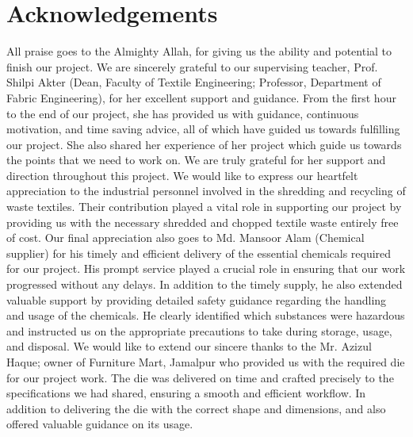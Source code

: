 \section*{Acknowledgements}
All praise goes to the Almighty Allah, for giving us the ability and potential to finish
our project. We are sincerely grateful to our supervising teacher, Prof. Shilpi Akter (Dean, Faculty of Textile Engineering; Professor, Department of Fabric Engineering), for her excellent support and guidance. From the first hour to the end of our project, she has provided us with guidance, continuous motivation, and time saving advice, all of which have guided us towards fulfilling our project. She also shared her experience of her project which guide us towards the points that we need to work on. We are truly grateful for her support and direction throughout this project. We would like to express our heartfelt appreciation to the industrial personnel involved in the shredding and recycling of waste textiles. Their contribution played a vital role in supporting our project by providing us with the necessary shredded and chopped textile waste entirely free of cost. Our final appreciation also goes to Md. Mansoor Alam (Chemical supplier) for his timely and efficient delivery of the essential chemicals required for our project. His prompt service played a crucial role in ensuring that our work progressed without any delays. In addition to the timely supply, he also extended valuable support by providing detailed safety guidance regarding the handling and usage of the chemicals. He clearly identified which substances were hazardous and instructed us on the appropriate precautions to take during storage, usage, and disposal. We would like to extend our sincere thanks to the Mr. Azizul Haque; owner of Furniture Mart, Jamalpur who provided us with the required die for our project work. The die was delivered on time and crafted precisely to the specifications we had shared, ensuring a smooth and efficient workflow. In addition to delivering the die with the correct shape and dimensions, and also offered valuable guidance on its usage.